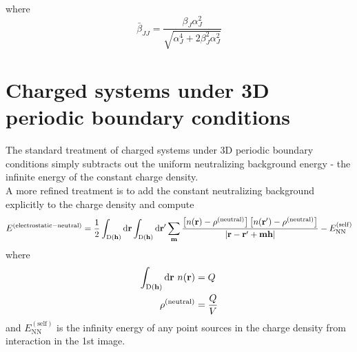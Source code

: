 \documentclass[paper=a4, fontsize=11pt]{article} %
\numberwithin{equation}{section} %
\numberwithin{figure}{section} %
\numberwithin{table}{section} %
\newcommand{\bh}{{\bf{h}}}
\newcommand{\bm}{{\bf{m}}}
\newcommand{\br}{{\bf{r}}}
\newcommand{\rNN}{{\mathrm{NN}}}
\newcommand{\rself}{{\mathrm{self}}}
\newcommand{\rd}{{\mathrm{d}}}
\newcommand{\rD}{{\mathrm{D}}}
\newcommand{\al}{{\alpha}}
\begin{document}
where
\begin{equation}
\bar{\beta}_{JJ}= \frac{\beta_J \al_J^2}{\sqrt{\al_J^4 + 2\beta_J^2\al_J^2 }}
\end{equation}

\newpage
\section{Charged systems under 3D periodic boundary conditions}\label{App:c3D}
The standard treatment of charged systems under 3D periodic boundary conditions simply subtracts out the uniform neutralizing background energy - the infinite energy of the constant charge density.\\

A more refined treatment is to add the constant neutralizing background explicitly to the charge density and compute
\begin{equation}\label{eq:m1}
\begin{split}
E^{(\mathrm{electrostatic-neutral})}
&= \frac{1}{2}\int_{\rD(\bh)} \rd \br \int_{\rD(\bh)}\rd \br'\sum_\bm \frac{\left[n(\br)-\rho^{(\mathrm{neutral})}\right]\left[n(\br')-\rho^{(\mathrm{neutral})}\right]}{|\br-\br'+\bm\bh|} - E_{\rNN}^{(\rself)}\\
\end{split}
\end{equation}
where 
\begin{equation}
\begin{split}
\int_{\rD(\bh)} \rd \br\ n(\br) &= Q \\
\rho^{(\mathrm{neutral})} &= \frac{Q}{V}
\end{split}
\end{equation}
and $E_{\rNN}^{(\rself)}$ is the infinity energy of any point sources in the charge density from interaction in the 1st image.\\
\end{document}
